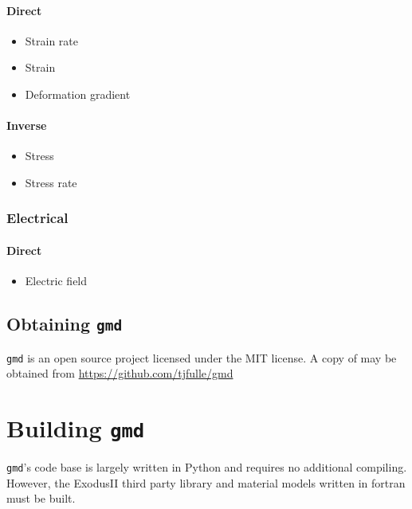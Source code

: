 \documentclass[11pt]{report}
\newcommand{\gmd}{\texttt{gmd}}
\begin{document}
\subsubsection{Direct}
\begin{itemize}
  \item Strain rate
  \item Strain
  \item Deformation gradient
\end{itemize}

\subsubsection{Inverse}
\begin{itemize}
  \item Stress
  \item Stress rate
\end{itemize}

\subsection{Electrical}

\subsubsection{Direct}

\begin{itemize}
  \item Electric field
\end{itemize}

\section{Obtaining \gmd{}}
\gmd{} is an open source project licensed under the MIT license. A copy of may
be obtained from \url{https://github.com/tjfulle/gmd}



\chapter{Building \gmd}
\gmd's code base is largely written in Python and requires no additional
compiling.  However, the ExodusII third party library and material models
written in fortran must be built.
\end{document}
